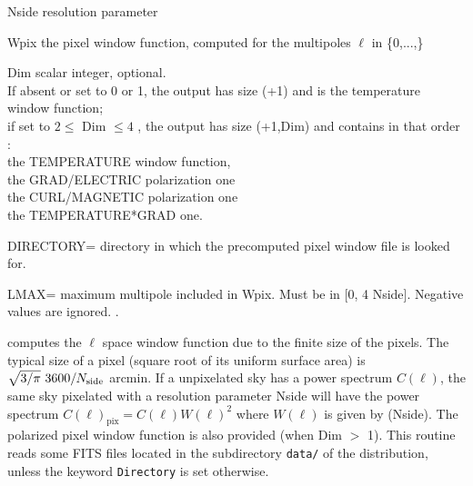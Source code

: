 \begin{qualifiers}
  \begin{qulist}{} %
    \item[Nside\mytarget{idl:healpixwindow:nside}] resolution parameter
    \item[Wpix\mytarget{idl:healpixwindow:wpix}] the pixel window function, computed for the multipoles $\ell$ in \{0,...,\}
    \item[Dim\mytarget{idl:healpixwindow:Dim}] scalar integer, optional. \\
     If absent or set to 0 or 1,
          the output has size (+1) and is the temperature
    window function;\\
     if set to $2 \le$ Dim $\le 4$ ,
          the output has size (+1,Dim)
          and contains in that order : \\
	  the TEMPERATURE window function,\\
          the GRAD/ELECTRIC polarization one\\
          the CURL/MAGNETIC polarization one\\
          the TEMPERATURE*GRAD one.
   \item[DIRECTORY=\mytarget{idl:healpixwindow:directory}] directory in which the precomputed pixel window file is looked for.\\
   \item[LMAX=\mytarget{idl:healpixwindow:lmax}] maximum multipole included in Wpix. 
	Must be in [0, 4 Nside].
        Negative values are ignored.
	.
  \end{qulist}
\end{qualifiers}


\begin{codedescription}
{\thedocid{} computes the $\ell$ space window function due to the finite size of the
\healpix pixels. The typical size of a pixel (square root of its uniform surface
area) is $\sqrt{3/\pi}\ 3600/N_{\mathrm{side}}$ arcmin.
If a unpixelated sky has a power spectrum $C(\ell)$, the same
sky pixelated with a resolution parameter Nside 
will have the power spectrum $C(\ell)_{\mathrm{pix}} = C(\ell)
W(\ell)^2$ where $W(\ell)$ is given by \thedocid(Nside). The polarized
pixel window function is also provided (when Dim $>$ 1).
This routine reads some FITS files located in the subdirectory {\tt data/} of the
\healpix distribution, unless the keyword {\tt Directory} is set otherwise.}
\end{codedescription}



